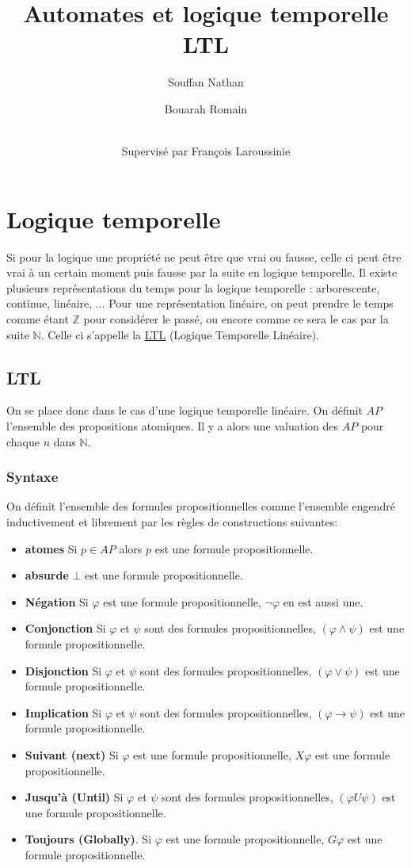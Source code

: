 \documentclass[12pt,a4paper]{article}
\title {Automates et logique temporelle LTL}
\author{
  Souffan Nathan \and
  Bouarah Romain \and
  \\Supervisé par François Laroussinie
}
\theoremstyle{plain}
\theoremstyle{definition}
\begin{document}
\maketitle
\newpage

\section{Logique temporelle}

Si pour la logique une propriété ne peut être que vrai ou fausse, celle ci peut être vrai à un certain moment puis fausse par la suite en logique temporelle.
Il existe plusieurs représentations du temps pour la logique temporelle : arborescente, continue, linéaire, ...
Pour une représentation linéaire, on peut prendre le temps comme étant $\mathbb{Z}$ pour considérer le passé, ou encore comme ce sera le cas par la suite $\mathbb{N}$.
Celle ci s'appelle la \underline{LTL} (Logique Temporelle Linéaire).

\subsection{LTL}
On se place donc dans le cas d'une logique temporelle linéaire.
On définit $AP$ l'ensemble des propositions atomiques. Il y a alors une valuation des $AP$ pour chaque $n$ dans $\mathbb{N}$.

\subsubsection{Syntaxe}
On définit l'ensemble des formules propositionnelles comme l'ensemble engendré inductivement et librement par les règles de constructions suivantes:
\begin{itemize}
	\item[] \textbf{atomes} Si $p \in AP$ alors $p$ est une formule propositionnelle.
	\item[] \textbf{absurde} $\bot$ est une formule propositionnelle.
	\item[] \textbf{Négation} Si $\varphi$ est une formule propositionnelle, $\lnot \varphi$ en est aussi une.
	\item[] \textbf{Conjonction} Si $\varphi$ et $\psi$ sont des formules propositionnelles, $(\varphi\land \psi)$ est une formule propositionnelle.
	\item[] \textbf{Disjonction} Si $\varphi$ et $\psi$ sont des formules propositionnelles, $(\varphi\lor \psi)$ est une formule propositionnelle.
	\item[] \textbf{Implication} Si $\varphi$ et $\psi$ sont des formules propositionnelles, $(\varphi \to \psi)$ est une formule propositionnelle.
	\item[] \textbf{Suivant (next)} Si $\varphi$ est une formule propositionnelle, $X\varphi$ est une formule propositionnelle.
	\item[] \textbf{Jusqu'à (Until)} Si $\varphi$ et $\psi$ sont des formules propositionnelles, $(\varphi U \psi)$ est une formule propositionnelle.
	\item[] \textbf{Toujours (Globally)}. Si $\varphi$ est une formule propositionnelle, $G\varphi$ est une formule propositionnelle.
\end{itemize}
\end{document}

